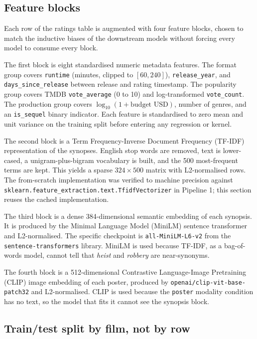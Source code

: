 \documentclass{article}
\begin{document}
\subsection{Feature blocks}

Each row of the ratings table is augmented with four feature blocks, chosen to match the inductive biases of the downstream models without forcing every model to consume every block.

The first block is eight standardised numeric metadata features. The format group covers \texttt{runtime} (minutes, clipped to $[60, 240]$), \texttt{release\_year}, and \texttt{days\_since\_release} between release and rating timestamp. The popularity group covers TMDB \texttt{vote\_average} (0 to 10) and log-transformed \texttt{vote\_count}. The production group covers $\log_{10}(1 + \text{budget USD})$, number of genres, and an \texttt{is\_sequel} binary indicator. Each feature is standardised to zero mean and unit variance on the training split before entering any regression or kernel.

The second block is a Term Frequency-Inverse Document Frequency (TF-IDF) representation of the synopses. English stop words are removed, text is lower-cased, a unigram-plus-bigram vocabulary is built, and the 500 most-frequent terms are kept. This yields a sparse $324 \times 500$ matrix with L2-normalised rows. The from-scratch implementation was verified to machine precision against \texttt{sklearn.feature\_extraction.text.TfidfVectorizer} in Pipeline 1; this section reuses the cached implementation.

The third block is a dense 384-dimensional semantic embedding of each synopsis. It is produced by the Minimal Language Model (MiniLM) sentence transformer and L2-normalised. The specific checkpoint is \texttt{all-MiniLM-L6-v2} from the \texttt{sentence-transformers} library. MiniLM is used because TF-IDF, as a bag-of-words model, cannot tell that \textit{heist} and \textit{robbery} are near-synonyms.

The fourth block is a 512-dimensional Contrastive Language-Image Pretraining (CLIP) image embedding of each poster, produced by \texttt{openai/clip-vit-base-patch32} and L2-normalised. CLIP is used because the \texttt{poster} modality condition has no text, so the model that fits it cannot see the synopsis block.

\subsection{Train/test split by film, not by row}
\end{document}
